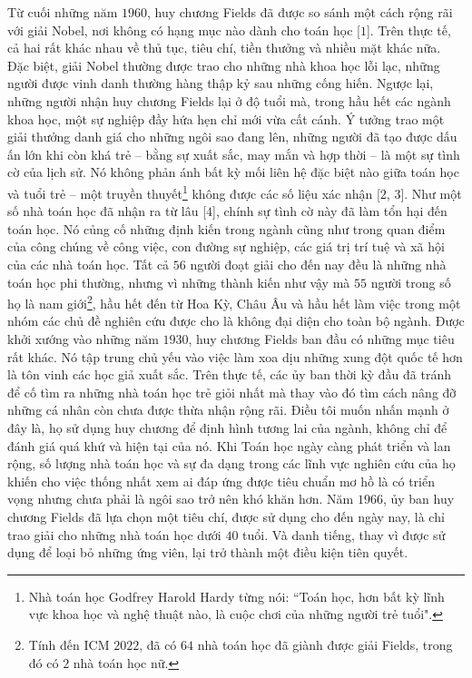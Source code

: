 \begin{multicols}{2}
	\vskip 0.1cm
	Từ cuối những năm $1960$, huy chương Fields đã được so sánh một cách rộng rãi với giải Nobel, nơi không có hạng mục nào dành cho toán học [$1$]. Trên thực tế, cả hai rất khác nhau về thủ tục, tiêu chí, tiền thưởng và nhiều mặt khác nữa. Đặc biệt, giải Nobel thường được trao cho những nhà khoa học lỗi lạc, những người được vinh danh thường hàng thập kỷ sau những cống hiến. Ngược lại, những người nhận huy chương Fields lại ở độ tuổi mà, trong hầu hết các ngành khoa học, một sự nghiệp đầy hứa hẹn chỉ mới vừa cất cánh.
	\vskip 0.1cm
	Ý tưởng trao một giải thưởng danh giá cho những ngôi sao đang lên, những người đã tạo được dấu ấn lớn khi còn khá trẻ -- bằng sự xuất sắc, may mắn và hợp thời -- là một sự tình cờ của lịch sử. Nó không phản ánh bất kỳ mối liên hệ đặc biệt nào giữa toán học và tuổi trẻ -- một truyền thuyết\footnote[3]{\color{lichsutoanhoc}Nhà toán học Godfrey Harold Hardy từng nói: ``Toán học, hơn bất kỳ lĩnh vực khoa học và nghệ thuật nào, là cuộc chơi của những người trẻ tuổi".} không được các số liệu xác nhận [$2$, $3$]. Như một số nhà toán học đã nhận ra từ lâu [$4$], chính sự tình cờ này đã làm tổn hại đến toán học. Nó củng cố những định kiến trong ngành cũng như trong quan điểm của công chúng về công việc, con đường sự nghiệp, các giá trị trí tuệ và xã hội của các nhà toán học. Tất cả $56$ người đoạt giải cho đến nay đều là những nhà toán học phi thường, nhưng vì những thành kiến như vậy mà $55$ người trong số họ là nam giới\footnote[4]{\color{lichsutoanhoc}Tính đến ICM $2022$, đã có $64$ nhà toán học đã giành được giải Fields, trong đó có $2$ nhà toán học nữ.}, hầu hết đến từ Hoa Kỳ, Châu Âu và hầu hết làm việc trong một nhóm các chủ đề nghiên cứu được cho là không đại diện cho toàn bộ ngành.
	\vskip 0.1cm
	Được khởi xướng vào những năm $1930$, huy chương Fields ban đầu có những mục tiêu rất khác. Nó tập trung chủ yếu vào việc làm xoa dịu những xung đột quốc tế hơn là tôn vinh các học giả xuất sắc. Trên thực tế, các ủy ban thời kỳ đầu đã tránh để cố tìm ra những nhà toán học trẻ giỏi nhất mà thay vào đó tìm cách nâng đỡ những cá nhân còn chưa được thừa nhận rộng rãi. Điều tôi muốn nhấn mạnh ở đây là, họ sử dụng huy chương để định hình tương lai của ngành, không chỉ để đánh giá quá khứ và hiện tại của nó.
	\vskip 0.1cm
	Khi Toán học ngày càng phát triển và lan rộng, số lượng nhà toán học và sự đa dạng trong các lĩnh vực nghiên cứu của họ khiến cho việc thống nhất xem ai đáp ứng được tiêu chuẩn mơ hồ là có triển vọng nhưng chưa phải là ngôi sao trở nên khó khăn hơn. 
	Năm $1966$, ủy ban huy chương Fields đã lựa chọn một tiêu chí, được sử dụng cho đến ngày nay, là chỉ trao giải cho những nhà toán học dưới $40$ tuổi. Và danh tiếng, thay vì được sử dụng để loại bỏ những ứng viên, lại trở thành một điều kiện tiên quyết.

\end{multicols}
